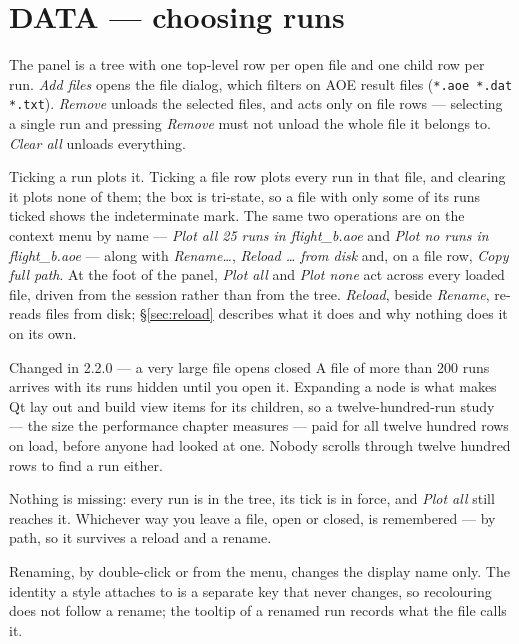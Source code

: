 \documentclass[11pt,a4paper,oneside]{report}
\newcommand{\appver}{2.2.0}
\newcommand{\code}[1]{\texttt{#1}}
\begin{document}
\section{DATA --- choosing runs}
\label{sec:data}

The panel is a tree with one top-level row per open file and one child row per
run. \emph{Add files} opens the file dialog, which filters on AOE result files
(\code{*.aoe *.dat *.txt}). \emph{Remove} unloads the selected files, and acts
only on file rows --- selecting a single run and pressing \emph{Remove} must not
unload the whole file it belongs to. \emph{Clear all} unloads everything.

Ticking a run plots it. Ticking a file row plots every run in that file, and
clearing it plots none of them; the box is tri-state, so a file with only some of
its runs ticked shows the indeterminate mark. The same two operations are on the
context menu by name --- \emph{Plot all 25 runs in flight\_b.aoe} and \emph{Plot
no runs in flight\_b.aoe} --- along with \emph{Rename\ldots}, \emph{Reload
\ldots{} from disk} and, on a file row, \emph{Copy full path}. At the foot of
the panel, \emph{Plot all} and \emph{Plot none} act across every loaded file,
driven from the session rather than from the tree. \emph{Reload}, beside
\emph{Rename}, re-reads files from disk; \S\ref{sec:reload} describes what it
does and why nothing does it on its own.

\begin{aoenew}{Changed in \appver{} --- a very large file opens closed}
A file of more than 200 runs arrives with its runs hidden until you open it.
Expanding a node is what makes Qt lay out and build view items for its
children, so a twelve-hundred-run study --- the size the performance chapter
measures --- paid for all twelve hundred rows on load, before anyone had looked
at one. Nobody scrolls through twelve hundred rows to find a run either.

Nothing is missing: every run is in the tree, its tick is in force, and
\emph{Plot all} still reaches it. Whichever way you leave a file, open or
closed, is remembered --- by path, so it survives a reload and a rename.
\end{aoenew}

Renaming, by double-click or from the menu, changes the display name only. The
identity a style attaches to is a separate key that never changes, so
recolouring does not follow a rename; the tooltip of a renamed run records what
the file calls it.
\end{document}
